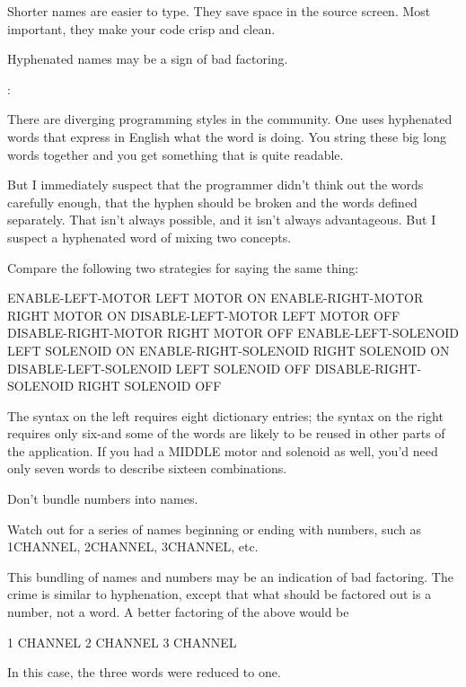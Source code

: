 Shorter names are easier to type.  They save space in the source
screen.  Most important, they make your code crisp and clean.

\begin{tip}
Hyphenated names may be a sign of bad factoring.
\end{tip}

\begin{interview}
:

\begin{tfquot}
There are diverging programming styles in the \Forth{} community.  One
uses hyphenated words that express in English what the word is doing.
You string these big long words together and you get something that is
quite readable.

But I immediately suspect that the programmer didn't think out the words
carefully enough, that the hyphen should be broken and the words defined
separately.  That isn't always possible, and it isn't always advantageous.
But I suspect a hyphenated word of mixing two concepts.
\end{tfquot}
\end{interview}
Compare the following two strategies for saying the same thing:
\begin{Code}
ENABLE-LEFT-MOTOR        LEFT MOTOR ON
ENABLE-RIGHT-MOTOR       RIGHT MOTOR ON
DISABLE-LEFT-MOTOR       LEFT MOTOR OFF
DISABLE-RIGHT-MOTOR      RIGHT MOTOR OFF
ENABLE-LEFT-SOLENOID     LEFT SOLENOID ON
ENABLE-RIGHT-SOLENOID    RIGHT SOLENOID ON
DISABLE-LEFT-SOLENOID    LEFT SOLENOID OFF
DISABLE-RIGHT-SOLENOID   RIGHT SOLENOID OFF
\end{Code}
The syntax on the left requires eight dictionary entries; the syntax on the
right requires only six-and some of the words are likely to be reused in
other parts of the application.  If you had a MIDDLE motor and solenoid
as well, you'd need only seven words to describe sixteen combinations.

\begin{tip}
Don't bundle numbers into names.
\end{tip}
Watch out for a series of names beginning or ending with numbers, such
as 1CHANNEL, 2CHANNEL, 3CHANNEL, etc.

This bundling of names and numbers may be an indication of bad
factoring.  The crime is similar to hyphenation, except that what should
be factored out is a number, not a word.  A better factoring of the above
would be
\begin{Code}
1 CHANNEL
2 CHANNEL
3 CHANNEL
\end{Code}
In this case, the three words were reduced to one.

